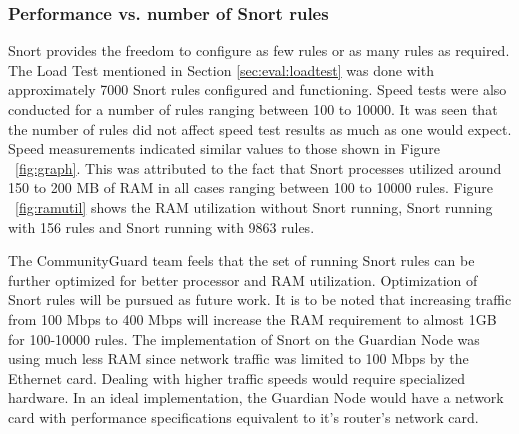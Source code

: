 \subsubsection{Performance vs. number of Snort rules}
\label{}
Snort provides the freedom to configure as few rules or as many rules as required. The Load Test mentioned in Section \ref{sec:eval:loadtest} was done with approximately 7000 Snort rules configured and functioning. Speed tests were also conducted for a number of rules ranging between 100 to 10000. It was seen that the number of rules did not affect speed test results as much as one would expect. Speed measurements indicated similar values to those shown in Figure ~\ref{fig:graph}. This was attributed to the fact that Snort processes utilized around 150 to 200 MB of RAM in all cases ranging between 100 to 10000 rules. Figure ~\ref{fig:ramutil} shows the RAM utilization without Snort running, Snort running with 156 rules and Snort running with 9863 rules. 

The CommunityGuard team  feels that the set of running Snort rules can be further optimized for better processor and RAM utilization. Optimization of Snort rules will be pursued as future work. It is to be noted that increasing traffic from 100 Mbps to 400 Mbps will increase the RAM requirement to almost 1GB for 100-10000 rules. The implementation of Snort on the Guardian Node was using much less RAM since network traffic was limited to 100 Mbps by the Ethernet card. Dealing with higher traffic speeds would require specialized hardware. In an ideal implementation, the Guardian Node would have a network card with performance specifications equivalent to it's router's network card.


